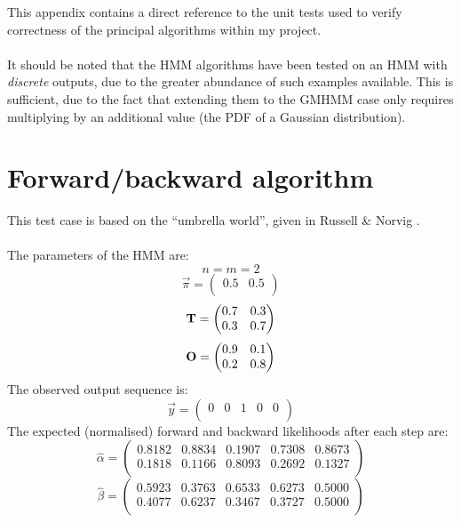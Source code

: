 \documentclass[12pt,a4paper,twoside,openright]{report}
\begin{document}
This appendix contains a direct reference to the unit tests used to verify correctness of the principal algorithms within my project. \\ \\
It should be noted that the HMM algorithms have been tested on an HMM with \emph{discrete} outputs, due to the greater abundance of such examples available. This is sufficient, due to the fact that extending them to the GMHMM case only requires multiplying by an additional value (the PDF of a Gaussian distribution).

\section{Forward/backward algorithm}

This test case is based on the ``umbrella world'', given in Russell \& Norvig \cite{Russell:2003:AIM:773294}.\\ \\
The parameters of the HMM are:
\[n = m = 2\]
\[{\vec{\pi}} = \left(\begin{matrix}
 0.5 & 0.5\\	
 \end{matrix}\right)
\]
\[{\bf T} = \left(\begin{matrix}
 0.7 & 0.3\\
 0.3 & 0.7\\	
 \end{matrix}\right)
\]
\[{\bf O} = \left(\begin{matrix}
 0.9 & 0.1\\
 0.2 & 0.8\\	
 \end{matrix}\right)
\]
The observed output sequence is:
\[\vec{y} = \left(\begin{matrix}
 0 & 0 & 1 & 0 & 0\\	
 \end{matrix}\right)
\]
The expected (normalised) forward and backward likelihoods after each step are:
\[
\hat{\alpha} = \left(\begin{matrix}
	0.8182 & 0.8834 & 0.1907 & 0.7308 & 0.8673\\
	0.1818 & 0.1166 & 0.8093 & 0.2692 & 0.1327\\
\end{matrix}\right)
\]
\[
\hat{\beta} = \left(\begin{matrix}
	0.5923 & 0.3763 & 0.6533 & 0.6273 & 0.5000\\
	0.4077 & 0.6237 & 0.3467 & 0.3727 & 0.5000\\
\end{matrix}\right)
\]
\newpage
\end{document}
